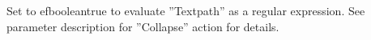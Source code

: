     Set to \app{}efbooleantrue to evaluate ''Textpath'' as a
  regular expression. See parameter description for ''Collapse''
  action for details.
